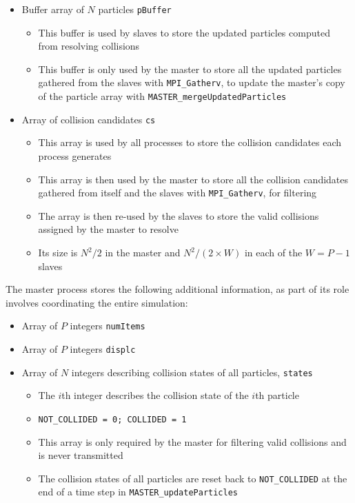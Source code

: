 \documentclass[12pt]{article}
\begin{document}
\begin{itemize}
\begin{itemize}
    \end{itemize}
    \item Buffer array of $N$ particles \texttt{pBuffer}
    \begin{itemize}
        \item This buffer is used by slaves to store the updated particles computed from resolving collisions
        \item This buffer is only used by the master to store all the updated particles gathered from the slaves with \texttt{MPI\_Gatherv}, to update the master's copy of the particle array with \texttt{MASTER\_mergeUpdatedParticles}
    \end{itemize}
    \item Array of collision candidates \texttt{cs}
    \begin{itemize}
        \item This array is used by all processes to store the collision candidates each process generates
        \item This array is then used by the master to store all the collision candidates gathered from itself and the slaves with \texttt{MPI\_Gatherv}, for filtering
        \item The array is then re-used by the slaves to store the valid collisions assigned by the master to resolve
        \item Its size is $N^2 / 2$ in the master and $N^2 / (2 \times W)$ in each of the $W = P - 1$ slaves
    \end{itemize}
\end{itemize}

The master process stores the following additional information, as part of its role involves coordinating the entire simulation:
\begin{itemize}
    \item Array of $P$ integers \texttt{numItems}
    \item Array of $P$ integers \texttt{displc}
    \item Array of $N$ integers describing collision states of all particles, \texttt{states}
    \begin{itemize}
        \item The $i$th integer describes the collision state of the $i$th particle
        \item \texttt{NOT\_COLLIDED = 0; COLLIDED = 1}
        \item This array is only required by the master for filtering valid collisions and is never transmitted
        \item The collision states of all particles are reset back to \texttt{NOT\_COLLIDED} at the end of a time step in \texttt{MASTER\_updateParticles}
    \end{itemize}
\end{itemize}
\end{document}
